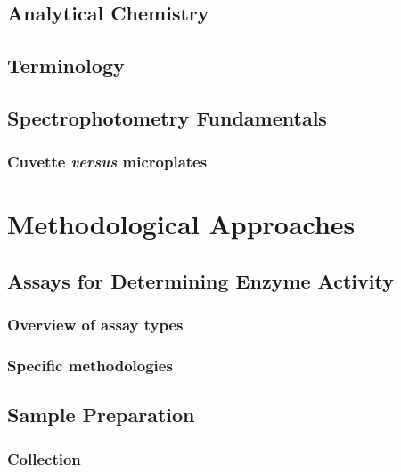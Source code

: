 \documentclass[
  9pt,
  american,
  a5paper,
  extrafontsizes,onecolumn,openright
  ]{memoir}
\begin{document}
\chapter{Analytical Chemistry}\label{analytical-chemistry}

\chapter{Terminology}\label{terminology}

\chapter{Spectrophotometry Fundamentals}\label{spectrophotometry-fundamentals}

\section{\texorpdfstring{Cuvette \emph{versus} microplates}{Cuvette versus microplates}}\label{cuvette-versus-microplates}

\part{Methodological Approaches}\label{part-methodological-approaches}

\chapter{Assays for Determining Enzyme Activity}\label{assays-for-determining-enzyme-activity}

\section{Overview of assay types}\label{overview-of-assay-types}

\section{Specific methodologies}\label{specific-methodologies}

\chapter{Sample Preparation}\label{sample-preparation}

\section{Collection}\label{collection}
\end{document}
